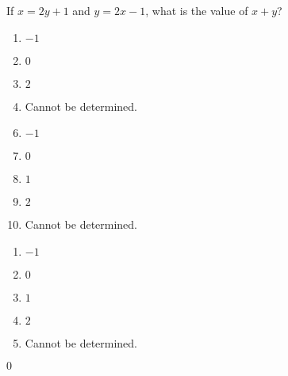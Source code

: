 


 If $x=2y+1$ and $y=2x-1$, what is the value of $x+y$?


\ifsat
	\begin{enumerate}[label=\Alph*)]
		\item   $-1$
		\item  $0$%
		\item  $2$
		\item  Cannot be determined.
	\end{enumerate}
\else
\fi

\ifacteven
	\begin{enumerate}[label=\textbf{\Alph*.},itemsep=\fill,align=left]
		\setcounter{enumii}{5}
		\item   $-1$
		\item  $0$%
		\item  $1$
		\addtocounter{enumii}{1}
		\item  $2$
		\item  Cannot be determined.
	\end{enumerate}
\else
\fi

\ifactodd
	\begin{enumerate}[label=\textbf{\Alph*.},itemsep=\fill,align=left]
		\item   $-1$
		\item  $0$%
		\item  $1$
		\item  $2$
		\item  Cannot be determined.
	\end{enumerate}
\else
\fi

\ifgridin
  $0$%
		
\else
\fi

